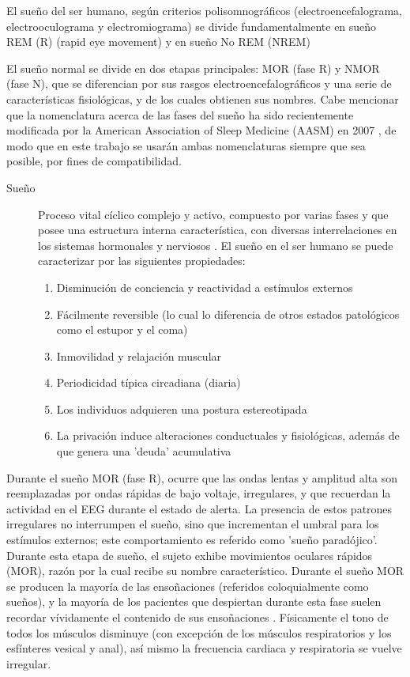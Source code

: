 El sueño del ser humano, según criterios polisomnográficos (electroencefalograma, electrooculograma y electromiograma) se divide fundamentalmente en sueño REM (R) (rapid eye movement) y en sueño No REM (NREM)

El sue\~no normal se divide en dos etapas principales: MOR (fase R) y NMOR (fase N), que se 
diferencian por sus rasgos electroencefalogr\'aficos y una serie de caracter\'isticas 
fisiol\'ogicas, y de los cuales obtienen sus nombres.
Cabe mencionar que la nomenclatura acerca de las fases del sue\~no ha sido recientemente modificada 
por la American Association of Sleep Medicine (AASM) en 2007 \cite{AASM07}, de modo que en este 
trabajo se  usar\'an ambas nomenclaturas siempre que sea posible, por fines de compatibilidad.

\begin{description}
\item[Sue\~no] Proceso vital c\'iclico complejo y activo, compuesto por varias fases y que posee 
una estructura interna caracter\'istica, con diversas interrelaciones en los sistemas hormonales y 
nerviosos \cite{FernandezConde07}.
El sue\~no en el ser humano se puede caracterizar por las siguientes 
propiedades\cite{CarrilloMora}:
\begin{enumerate}
\item Disminuci\'on de conciencia y reactividad a est\'imulos externos
\item F\'acilmente reversible (lo cual lo diferencia de otros estados 
patol\'ogicos como el estupor y el coma)
\item Inmovilidad y relajaci\'on muscular
\item Periodicidad t\'ipica circadiana (diaria)
\item Los individuos adquieren una postura estereotipada
\item La privaci\'on induce alteraciones conductuales y 
fisiol\'ogicas, adem\'as de que genera una 'deuda' acumulativa
\end{enumerate}
\end{description}

Durante el sue\~no MOR (fase R), ocurre que las ondas lentas y amplitud alta son reemplazadas por 
ondas r\'apidas de bajo voltaje, irregulares, y que recuerdan la actividad en el EEG durante el 
estado de alerta.
La presencia de estos patrones irregulares no interrumpen el sue\~no, sino que incrementan el 
umbral para los est\'imulos externos; este comportamiento es referido como 'sue\~no parad\'ojico'.
Durante esta etapa de sue\~no, el sujeto exhibe movimientos oculares r\'apidos (MOR), raz\'on por 
la cual recibe su nombre caracter\'istico.
Durante el sue\~no MOR se producen la mayor\'ia de las enso\~naciones (referidos coloquialmente 
como sue\~nos), y la mayor\'ia de los pacientes que despiertan durante esta fase suelen recordar 
v\'ividamente el contenido de sus enso\~naciones \cite{Chokroverty09}.
F\'isicamente el tono de todos los m\'usculos disminuye (con excepci\'on de los m\'usculos 
respiratorios y los esf\'interes vesical y anal), as\'i mismo la frecuencia cardiaca y respiratoria 
se vuelve irregular.

